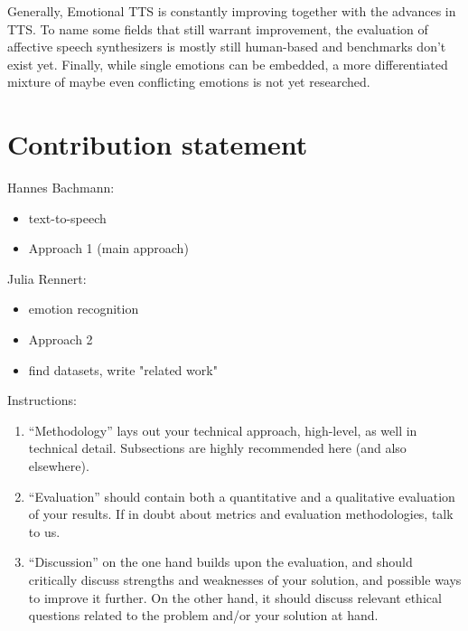 \documentclass[11pt]{article}
\begin{document}
Generally, Emotional TTS is constantly improving together with the advances in TTS. To name some fields that still warrant improvement, the evaluation of affective speech synthesizers is mostly still human-based and benchmarks don't exist yet. Finally, while single emotions can be embedded, a more differentiated mixture of maybe even conflicting emotions is not yet researched.

\section{Contribution statement}
Hannes Bachmann:
\begin{itemize}
\item text-to-speech
\item Approach 1 (main approach)
\end{itemize}
Julia Rennert:
\begin{itemize}
\item emotion recognition
\item Approach 2
\item find datasets, write "related work"
\end{itemize}

% 


Instructions: 
\begin{enumerate}

    \item ``Methodology'' lays out your technical approach, high-level, as well in technical detail. Subsections are highly recommended here (and also elsewhere).
    \item ``Evaluation'' should contain both a quantitative and a qualitative evaluation of your results. If in doubt about metrics and evaluation methodologies, talk to us.
    \item ``Discussion'' on the one hand builds upon the evaluation, and should critically discuss strengths and weaknesses of your solution, and possible ways to improve it further. On the other hand, it should discuss relevant ethical questions related to the problem and/or your solution at hand.
\end{enumerate}
\end{document}
